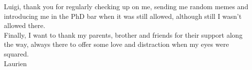 \documentclass[12pt,a4paper]{article}
\numberwithin{equation}{section}
\numberwithin{figure}{section}
\numberwithin{table}{section}
\begin{document}
\noindent Luigi, thank you for regularly checking up on me, sending me
random memes and introducing me in the PhD bar when it was 
still allowed, although still I wasn't allowed there.\\

\noindent Finally, I want to thank my parents, brother and friends 
for their support along the way, always there to offer some love and distraction
when my eyes were squared. \\

Laurien





\vspace{0.6cm}
\end{document}
